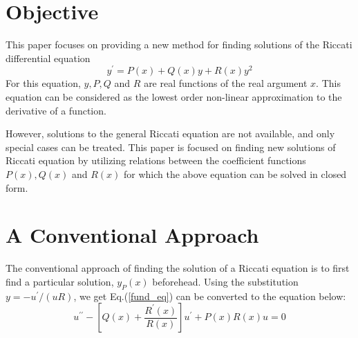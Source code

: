 \documentclass{article}
\begin{document}
\large
\hrulefill

\thispagestyle{empty}

\begin{center}
\begin{large}
\end{large}

\hrulefill

\end{center}
\par
\section{Objective}
This paper focuses on providing a new method for finding solutions of the Riccati differential equation 
\begin{equation}
y ^ { \prime } = P ( x ) + Q ( x ) y + R ( x ) y ^ { 2 }
\end{equation}
\label{fund_eq}
For this equation, $y, P, Q$ and
$R$ are real functions of the real argument $x$. This equation can be considered as the lowest order non-linear approximation to the derivative of a function.

However,  solutions to the
general Riccati equation are not available, and only special cases can be treated. This paper is focused on  finding new solutions of Riccati equation by utilizing relations between the coefficient functions $P(x), Q(x)$ and $R(x)$ for which the above equation can be solved in closed form.

\section{A Conventional Approach}
The conventional approach of finding the solution of a Riccati equation is to first find a particular solution, $y_P(x)$ beforehead. Using the substitution $y = - u ^ { \prime } / ( u R )$, we get Eq.(\ref{fund_eq}) can be converted to the equation below:
\begin{equation}
u ^ { \prime \prime } - \left[ Q ( x ) + \frac { R ^ { \prime } ( x ) } { R ( x ) } \right] u ^ { \prime } + P ( x ) R ( x ) u = 0
\end{equation}
\label{conv}
\end{document}
